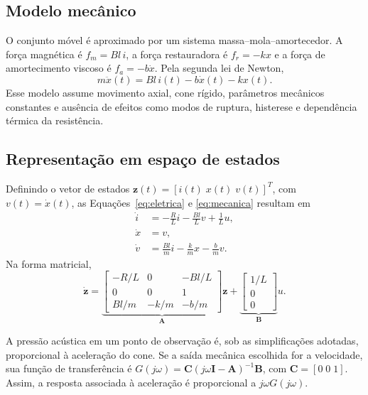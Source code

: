 \documentclass[11pt,letterpaper]{article}
\begin{document}
\subsection{Modelo mecânico}

O conjunto móvel é aproximado por um sistema massa--mola--amortecedor. A força magnética é
$f_m=Bl\,i$, a força restauradora é $f_r=-kx$ e a força de amortecimento viscoso é
$f_a=-b\dot{x}$. Pela segunda lei de Newton,
\begin{equation}
  m\ddot{x}(t)=Bl\,i(t)-b\dot{x}(t)-kx(t).
  \label{eq:mecanica}
\end{equation}
Esse modelo assume movimento axial, cone rígido, parâmetros mecânicos constantes e ausência de
efeitos como modos de ruptura, histerese e dependência térmica da resistência.

\subsection{Representação em espaço de estados}

Definindo o vetor de estados $\boldsymbol{z}(t)=[i(t)\;x(t)\;v(t)]^{T}$, com
$v(t)=\dot{x}(t)$, as Equações~\eqref{eq:eletrica} e \eqref{eq:mecanica} resultam em
\begin{equation}
  \begin{aligned}
    \dot{i} &= -\frac{R}{L}i-\frac{Bl}{L}v+\frac{1}{L}u,\\
    \dot{x} &= v,\\
    \dot{v} &= \frac{Bl}{m}i-\frac{k}{m}x-\frac{b}{m}v.
  \end{aligned}
  \label{eq:estados}
\end{equation}
Na forma matricial,
\begin{equation}
  \dot{\boldsymbol{z}}=
  \underbrace{\begin{bmatrix}
    -R/L & 0 & -Bl/L\\
    0 & 0 & 1\\
    Bl/m & -k/m & -b/m
  \end{bmatrix}}_{\boldsymbol{A}}\boldsymbol{z}
  +
  \underbrace{\begin{bmatrix}1/L\\0\\0\end{bmatrix}}_{\boldsymbol{B}}u.
  \label{eq:matricial}
\end{equation}

A pressão acústica em um ponto de observação é, sob as simplificações adotadas, proporcional à
aceleração do cone. Se a saída mecânica escolhida for a velocidade, sua função de transferência é
$G(j\omega)=\boldsymbol{C}(j\omega\boldsymbol{I}-\boldsymbol{A})^{-1}\boldsymbol{B}$, com
$\boldsymbol{C}=[0\;0\;1]$. Assim, a resposta associada à aceleração é proporcional a
$j\omega G(j\omega)$.
\end{document}
